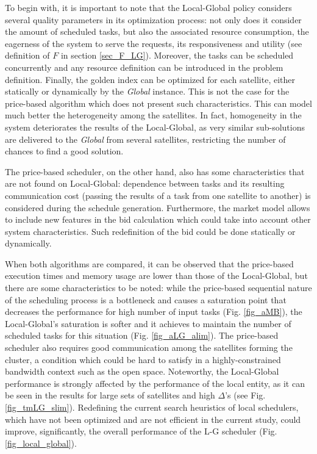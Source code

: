 To begin with, it is important to note that the Local-Global policy considers several quality parameters in its optimization process: not only does it consider the amount of scheduled tasks, but also the associated resource consumption, the eagerness of the system to serve the requests, its responsiveness and utility (see definition of $F$ in section \ref{sec_F_LG}). Moreover, the tasks can be scheduled concurrently and any resource definition can be introduced in the problem definition. Finally, the golden index can be optimized for each satellite, either statically or dynamically by the \emph{Global} instance. This is not the case for the price-based algorithm which does not present such characteristics. This can model much better the heterogeneity among the satellites. In fact, homogeneity in the system deteriorates the results of the Local-Global, as very similar sub-solutions are delivered to the \emph{Global} from several satellites, restricting the number of chances to find a good solution.

The price-based scheduler, on the other hand, also has some characteristics that are not found on Local-Global: dependence between tasks and its resulting communication cost (passing the results of a task from one satellite to another) is considered during the schedule generation. Furthermore, the market model allows to include new features in the bid calculation which could take into account other system characteristics. Such redefinition of the bid could be done statically or dynamically.

When both algorithms are compared, it can be observed that the price-based execution times and memory usage are lower than those of the Local-Global, but there are some characteristics to be noted: while the price-based sequential nature of the scheduling process is a bottleneck and causes a saturation point that decreases the performance for high number of input tasks (Fig. \ref{fig_aMB}), the Local-Global's saturation is softer and it achieves to maintain the number of scheduled tasks for this situation (Fig. \ref{fig_aLG_alim}). The price-based scheduler also requires good communication among the satellites forming the cluster, a condition which could be hard to satisfy in a highly-constrained bandwidth context such as the open space. %
Noteworthy, the Local-Global performance is strongly affected by the performance of the local entity, as it can be seen in the results for large sets of satellites and high $\Delta$'s (see Fig. \ref{fig_tmLG_slim}). Redefining the current search heuristics of local schedulers, which have not been optimized and are not efficient in the current study, could improve, significantly, the overall performance of the L-G scheduler (Fig. \ref{fig_local_global}).

